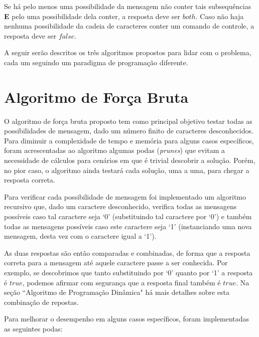\documentclass[a4paper,12pt,titlepage]{article}
\begin{document}
Se há pelo menos uma possibilidade da mensagem não conter tais subsequências \textbf{E} pelo uma possibilidade dela conter, a resposta deve ser $both$. Caso não haja nenhuma possibilidade da cadeia de caracteres conter um comando de controle, a resposta deve ser $false$.

A seguir serão descritos os três algoritmos propostos para lidar com o problema, cada um seguindo um paradigma de programação diferente.

\section{Algoritmo de Força Bruta}

O algoritmo de força bruta proposto tem como principal objetivo testar todas as possibilidades de mensagem, dado um número finito de caracteres desconhecidos. Para diminuir a complexidade de tempo e memória para alguns casos específicos, foram acrescentadas ao algoritmo algumas podas (\textit{prunes}) que evitam a necessidade de cálculos para cenários em que é trivial descobrir a solução. Porém, no pior caso, o algoritmo ainda testará cada solução, uma a uma, para chegar a resposta correta.

Para verificar cada possibilidade de mensagem foi implementado um algoritmo recursivo que, dado um caractere desconhecido, verifica todas as mensagens possíveis caso tal caractere seja `0' (substituindo tal caractere por `0') e também todas as mensagens possíveis caso este caractere seja `1' (instanciando uma nova mensagem, desta vez com o caractere igual a `1').

As duas respostas são então comparadas e combinadas, de forma que a resposta correta para a mensagem até aquele caractere passe a ser conhecida. Por exemplo, se descobrimos que tanto substituindo por `0' quanto por `1' a resposta é $true$, podemos afirmar com segurança que a resposta final também é $true$. Na seção ``Algoritmo de Programação Dinâmica" há mais detalhes sobre esta combinação de repostas.

Para melhorar o desempenho em alguns casos específicos, foram implementadas as seguintes podas:
\end{document}
